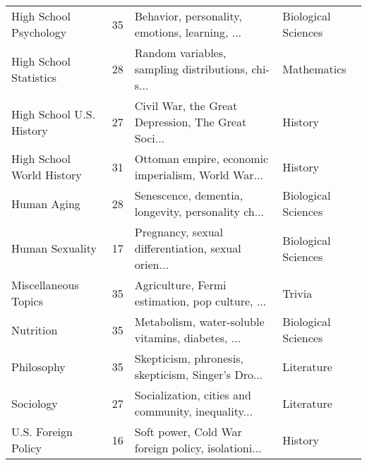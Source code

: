 \begin{tabular}{lrll}
             High School Psychology &              35 &     Behavior, personality, emotions, learning, ... & Biological Sciences \\
             High School Statistics &              28 & Random variables, sampling distributions, chi-s... &         Mathematics \\
           High School U.S. History &              27 & Civil War, the Great Depression, The Great Soci... &             History \\
          High School World History &              31 & Ottoman empire, economic imperialism, World War... &             History \\
                        Human Aging &              28 & Senescence, dementia, longevity, personality ch... & Biological Sciences \\
                    Human Sexuality &              17 & Pregnancy, sexual differentiation, sexual orien... & Biological Sciences \\
               Miscellaneous Topics &              35 &    Agriculture, Fermi estimation, pop culture, ... &              Trivia \\
                          Nutrition &              35 &  Metabolism, water-soluble vitamins, diabetes, ... & Biological Sciences \\
                         Philosophy &              35 & Skepticism, phronesis, skepticism, Singer’s Dro... &          Literature \\
                          Sociology &              27 & Socialization, cities and community, inequality... &          Literature \\
                U.S. Foreign Policy &              16 & Soft power, Cold War foreign policy, isolationi... &             History \\
\bottomrule
\end{tabular}
